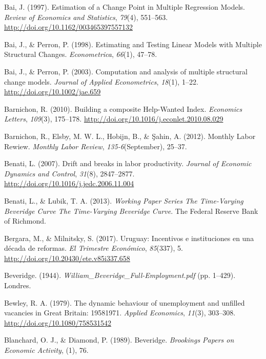 \documentclass[12pt,oneside]{reedthesis}
\begin{document}
\leavevmode\hypertarget{ref-Bai1997}{}%
Bai, J. (1997). Estimation of a Change Point in Multiple Regression Models. \emph{Review of Economics and Statistics}, \emph{79}(4), 551--563. \url{http://doi.org/10.1162/003465397557132}

\leavevmode\hypertarget{ref-BaiPerron1998}{}%
Bai, J., \& Perron, P. (1998). Estimating and Testing Linear Models with Multiple Structural Changes. \emph{Econometrica}, \emph{66}(1), 47--78.

\leavevmode\hypertarget{ref-BaiPerron2003}{}%
Bai, J., \& Perron, P. (2003). Computation and analysis of multiple structural change models. \emph{Journal of Applied Econometrics}, \emph{18}(1), 1--22. \url{http://doi.org/10.1002/jae.659}

\leavevmode\hypertarget{ref-Barnichon2010}{}%
Barnichon, R. (2010). Building a composite Help-Wanted Index. \emph{Economics Letters}, \emph{109}(3), 175--178. \url{http://doi.org/10.1016/j.econlet.2010.08.029}

\leavevmode\hypertarget{ref-Barnichon2012}{}%
Barnichon, R., Elsby, M. W. L., Hobijn, B., \& Şahin, A. (2012). Monthly Labor Rewiew. \emph{Monthly Labor Review}, \emph{135-6}(September), 25--37.

\leavevmode\hypertarget{ref-Benati2007}{}%
Benati, L. (2007). Drift and breaks in labor productivity. \emph{Journal of Economic Dynamics and Control}, \emph{31}(8), 2847--2877. \url{http://doi.org/10.1016/j.jedc.2006.11.004}

\leavevmode\hypertarget{ref-Benati2013}{}%
Benati, L., \& Lubik, T. A. (2013). \emph{Working Paper Series The Time-Varying Beveridge Curve The Time-Varying Beveridge Curve}. The Federal Reserve Bank of Richmond.

\leavevmode\hypertarget{ref-Bergara2017}{}%
Bergara, M., \& Milnitsky, S. (2017). Uruguay: Incentivos e instituciones en una década de reformas. \emph{El Trimestre Económico}, \emph{85}(337), 5. \url{http://doi.org/10.20430/ete.v85i337.658}

\leavevmode\hypertarget{ref-Beveridge}{}%
Beveridge. (1944). \emph{William\_Beveridge\_Full-Employment.pdf} (pp. 1--429). Londres.

\leavevmode\hypertarget{ref-Bewley1979}{}%
Bewley, R. A. (1979). The dynamic behaviour of unemployment and unfilled vacancies in Great Britain: 19581971. \emph{Applied Economics}, \emph{11}(3), 303--308. \url{http://doi.org/10.1080/758531542}

\leavevmode\hypertarget{ref-Blanchard1989}{}%
Blanchard, O. J., \& Diamond, P. (1989). Beveridge. \emph{Brookings Papers on Economic Activity}, (1), 76.
\end{document}
